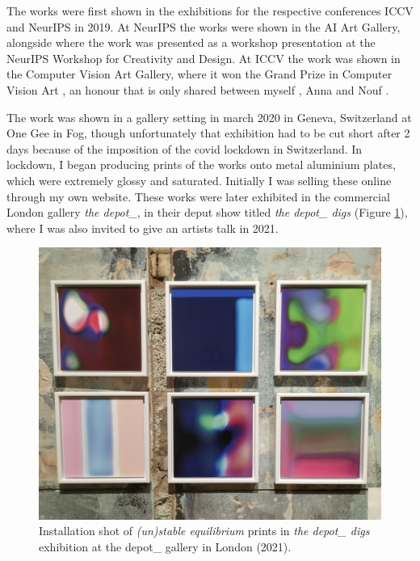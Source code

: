 The works were first shown in the exhibitions for the respective conferences ICCV and NeurIPS in 2019. 
At NeurIPS the works were shown in the AI Art Gallery, alongside where the work was presented as a workshop presentation at the NeurIPS Workshop for Creativity and Design. 
At ICCV the work was shown in the Computer Vision Art Gallery, where it won the Grand Prize in Computer Vision Art , an honour that is only shared between myself \citep{broad2019unstable}, Anna \citet{ridler2018mosaic} and Nouf \citet{aljowaysir2021salaf}.

The work was shown in a gallery setting in march 2020 in Geneva, Switzerland at One Gee in Fog, though unfortunately that exhibition had to be cut short after 2 days because of the imposition of the covid lockdown in Switzerland. 
In lockdown, I began producing prints of the works onto metal aluminium plates, which were extremely glossy and saturated. 
Initially I was selling these online through my own website. These works were later exhibited in the commercial London gallery \textit{the depot\_}, in their deput show titled \textit{the depot\_ digs} \citep{depot2021digs} (Figure \ref{fig:c7:depot_digs}), where I was also invited to give an artists talk in 2021.

\begin{figure}[!htb]
    \centering
    \captionsetup{justification=centering}
    \includegraphics[width=1\textwidth]{figures/c7_impact/depot_cropped.png}
    \caption{Installation shot of \textit{(un)stable equilibrium} prints in \textit{the depot\_ digs} exhibition at the depot\_ gallery in London (2021).}
    \label{fig:c7:depot_digs}
\end{figure}

